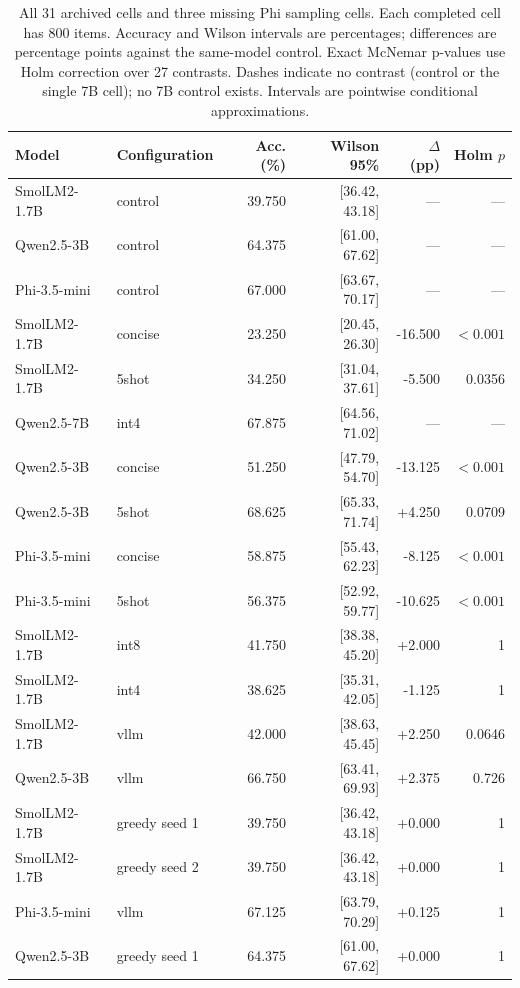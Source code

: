 \begin{table}[tbp]
\centering\small
\caption{All 31 archived cells and three missing Phi sampling cells. Each completed cell has 800 items. Accuracy and Wilson intervals are percentages; differences are percentage points against the same-model control. Exact McNemar p-values use Holm correction over 27 contrasts. Dashes indicate no contrast (control or the single 7B cell); no 7B control exists. Intervals are pointwise conditional approximations.}\label{tab:master}
\begin{tabular}{llrrrr}\toprule
Model & Configuration & Acc. (\%) & Wilson 95\% & $\Delta$ (pp) & Holm $p$ \\
\midrule
SmolLM2-1.7B & control & 39.750 & [36.42, 43.18] & --- & --- \\
Qwen2.5-3B & control & 64.375 & [61.00, 67.62] & --- & --- \\
Phi-3.5-mini & control & 67.000 & [63.67, 70.17] & --- & --- \\
SmolLM2-1.7B & concise & 23.250 & [20.45, 26.30] & -16.500 & $<0.001$ \\
SmolLM2-1.7B & 5shot & 34.250 & [31.04, 37.61] & -5.500 & 0.0356 \\
Qwen2.5-7B & int4 & 67.875 & [64.56, 71.02] & --- & --- \\
Qwen2.5-3B & concise & 51.250 & [47.79, 54.70] & -13.125 & $<0.001$ \\
Qwen2.5-3B & 5shot & 68.625 & [65.33, 71.74] & +4.250 & 0.0709 \\
Phi-3.5-mini & concise & 58.875 & [55.43, 62.23] & -8.125 & $<0.001$ \\
Phi-3.5-mini & 5shot & 56.375 & [52.92, 59.77] & -10.625 & $<0.001$ \\
SmolLM2-1.7B & int8 & 41.750 & [38.38, 45.20] & +2.000 & 1 \\
SmolLM2-1.7B & int4 & 38.625 & [35.31, 42.05] & -1.125 & 1 \\
SmolLM2-1.7B & vllm & 42.000 & [38.63, 45.45] & +2.250 & 0.0646 \\
Qwen2.5-3B & vllm & 66.750 & [63.41, 69.93] & +2.375 & 0.726 \\
SmolLM2-1.7B & greedy seed 1 & 39.750 & [36.42, 43.18] & +0.000 & 1 \\
SmolLM2-1.7B & greedy seed 2 & 39.750 & [36.42, 43.18] & +0.000 & 1 \\
Phi-3.5-mini & vllm & 67.125 & [63.79, 70.29] & +0.125 & 1 \\
Qwen2.5-3B & greedy seed 1 & 64.375 & [61.00, 67.62] & +0.000 & 1 \\

\end{tabular}
\end{table}
